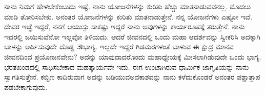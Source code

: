 ನಾನು ನಿಮಗೆ ಹೇಳಬೇಕೆಂಬುದು ಇಷ್ಟೆ. ನಾನು ಯೋಜನೆಗಳನ್ನು ಕುರಿತು ಹೆಚ್ಚು ಮಾತನಾಡುವವನಲ್ಲ. ಮೊದಲು ಮಾಡಿ ತೋರಿಸಬೇಕು. ಅನಂತರ ಯೋಜನೆಗಳನ್ನು ಕುರಿತು ಮಾತನಾಡುತ್ತೇನೆ. ನನ್ನ ಯೋಜನೆಗಳು ಎಷ್ಟೋ ಇವೆ. ದೇವರ ಇಚ್ಛೆ ಇದ್ದರೆ, ನನಗೆ ಆಯುಸ್ಸು ಸಾಕಷ್ಟು ಇದ್ದರೆ ನಾನು ಅವುಗಳನ್ನು ಕಾರ್ಯರೂಪಕ್ಕೆ ತರುತ್ತೇನೆ. ನಾನು ಇದರಲ್ಲಿ ಜಯಿಸುವೆನೋ ಇಲ್ಲವೋ ತಿಳಿಯದು. ಆದರೆ ಜೀವನದಲ್ಲಿ ಒಂದು ಮಹಾ ಆದರ್ಶವನ್ನು ಸ್ವೀಕರಿಸಿ ಅದಕ್ಕಾಗಿ ಬಾಳನ್ನು ಅರ್ಪಿಸುವುದೇ ದೊಡ್ಡ ಸೌಭಾಗ್ಯ. ಇಲ್ಲದೇ ಇದ್ದರೆ ಗಿಡಮರಗಳಂತೆ ಬಾಳುವ ಈ ಕ್ಷುದ್ರ ಮಾನವ ಜೀವನದಿಂದ ಪ್ರಯೋಜನವೇನು? ಅದನ್ನು ಯಾವುದಾದರೊಂದು ಮಹಾಧ್ಯೇಯಕ್ಕೆ ಮೀಸಲಾಗಿಡುವುದೇ ಒಂದು ಭಾಗ್ಯ. ಭರತಖಂಡದಲ್ಲಿ ಸಾಧಿಸಬೇಕಾದ ಮಹತ್ಕಾರ್ಯವೇ ಇದು. ಈಗ ಉಂಟಾಗಿರುವ ಧಾರ್ಮಿಕ ಜಾಗೃತಿಯನ್ನು ನಾನು ಸ್ವಾಗತಿಸುತ್ತೇನೆ. ಕಬ್ಬಿಣ ಕಾದಿರುವಾಗ ಅದನ್ನು ಬಡಿಯುವ\break ಅವಕಾಶವನ್ನು ನಾನು ಕಳೆದುಕೊಂಡರೆ ಅನಂತರ ಪಶ್ಚಾತ್ತಾಪ ಪಡಬೇಕಾಗುವುದು.

